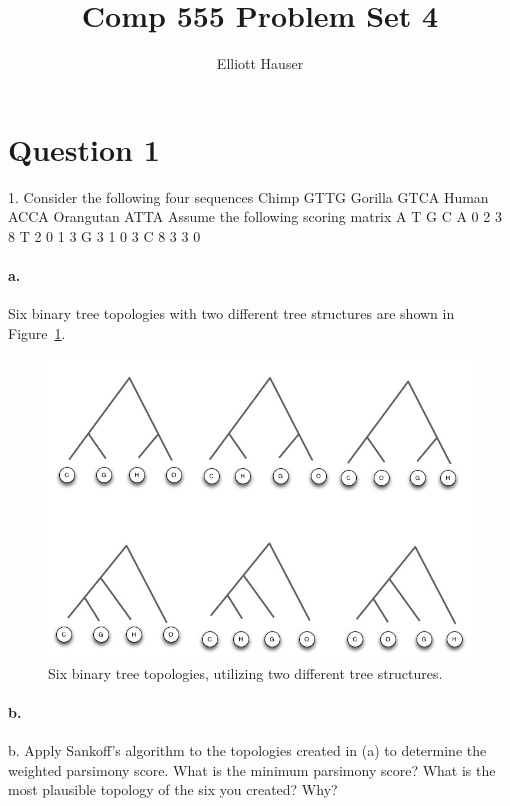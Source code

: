 \documentclass[12pt]{article}
\author{Elliott Hauser}
\title{Comp 555 Problem Set 4}
\begin{document}
\maketitle

\section*{Question 1}
1. Consider the following four sequences 
Chimp GTTG
Gorilla  GTCA
Human  ACCA
Orangutan ATTA
Assume the following scoring matrix
  A T G C
A 0 2 3 8
T 2 0 1 3
G 3 1 0 3
C 8 3 3 0

\paragraph{a.} %
\label{par:1a}
Six binary tree topologies with two different tree structures are shown in Figure~\ref{trees}. 

\begin{figure}[htb]
	\begin{center}
		\includegraphics[width=5in]{trees.jpg}
	\end{center}
	\caption{Six binary tree topologies, utilizing two different tree structures.}
	\label{trees}
\end{figure}

\paragraph{b.} %
\label{par:1b}
b. Apply Sankoff’s algorithm to the topologies created in (a) to 
determine the weighted parsimony score. What is the minimum parsimony 
score? What is the most plausible topology of the six you created? 
Why?
\end{document}
